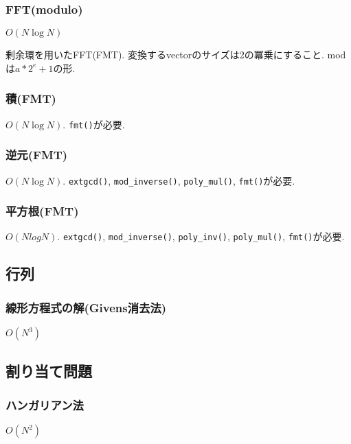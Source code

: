 \subsubsection{FFT(modulo)}
$O(N \log N)$\par
剰余環を用いたFFT(FMT). 変換するvectorのサイズは2の冪乗にすること. modは$a*2^e+1$の形.\\


\subsubsection{積(FMT)}
$O(N \log N)$. \texttt{fmt()}が必要.


\subsubsection{逆元(FMT)}
$O(N \log N)$. \texttt{extgcd()}, \texttt{mod\_inverse()}, \texttt{poly\_mul()}, \texttt{fmt()}が必要.


\subsubsection{平方根(FMT)}
$O(N log N)$. \texttt{extgcd()}, \texttt{mod\_inverse()}, \texttt{poly\_inv()}, \texttt{poly\_mul()}, \texttt{fmt()}が必要.



\subsection{行列}


\subsubsection{線形方程式の解(Givens消去法)}
$O(N^3)$


\subsection{割り当て問題}
\subsubsection{ハンガリアン法}
$O(N^2)$

